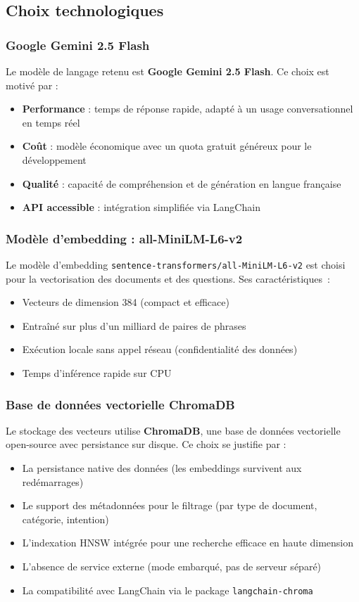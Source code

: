 \subsection{Choix technologiques}

\subsubsection{Google Gemini 2.5 Flash}

Le modèle de langage retenu est \textbf{Google Gemini 2.5 Flash}. Ce choix est motivé par :
\begin{itemize}
    \item \textbf{Performance} : temps de réponse rapide, adapté à un usage conversationnel en temps réel
    \item \textbf{Coût} : modèle économique avec un quota gratuit généreux pour le développement
    \item \textbf{Qualité} : capacité de compréhension et de génération en langue française
    \item \textbf{API accessible} : intégration simplifiée via LangChain
\end{itemize}

\subsubsection{Modèle d'embedding : all-MiniLM-L6-v2}

Le modèle d'embedding \texttt{sentence-transformers/all-MiniLM-L6-v2} est choisi pour la vectorisation des documents et des questions. Ses caractéristiques~:
\begin{itemize}
    \item Vecteurs de dimension 384 (compact et efficace)
    \item Entraîné sur plus d'un milliard de paires de phrases
    \item Exécution locale sans appel réseau (confidentialité des données)
    \item Temps d'inférence rapide sur CPU
\end{itemize}

\subsubsection{Base de données vectorielle ChromaDB}

Le stockage des vecteurs utilise \textbf{ChromaDB}, une base de données vectorielle open-source avec persistance sur disque. Ce choix se justifie par :
\begin{itemize}
    \item La persistance native des données (les embeddings survivent aux redémarrages)
    \item Le support des métadonnées pour le filtrage (par type de document, catégorie, intention)
    \item L'indexation HNSW intégrée pour une recherche efficace en haute dimension
    \item L'absence de service externe (mode embarqué, pas de serveur séparé)
    \item La compatibilité avec LangChain via le package \texttt{langchain-chroma}
\end{itemize}

